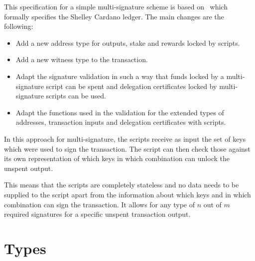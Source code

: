 \documentclass[11pt,a4paper,dvipsnames]{article}
\theoremstyle{definition}
\begin{document}
This specification for a simple multi-signature scheme is based
on~\cite{shelley_formal_spec} which formally specifies the Shelley Cardano
ledger. The main changes are the following:

\begin{itemize}
\item Add a new address type for outputs, stake and rewards locked by scripts.
\item Add a new witness type to the transaction.
\item Adapt the signature validation in such a way that funds locked by a
  multi-signature script can be spent and delegation certificates locked by
  multi-signature scripts can be used.
\item Adapt the functions used in the validation for the extended types of
  addresses, transaction inputs and delegation certificates with scripts.
\end{itemize}

In this approach for multi-signature, the scripts receive as input the set of
keys which were used to sign the transaction. The script can then check those
against its own representation of which keys in which combination can unlock the
unspent output.

This means that the scripts are completely stateless and no data needs to be
supplied to the script apart from the information about which keys and in which
combination can sign the transaction. It allows for any type of $n$ out of $m$
required signatures for a specific unspent transaction output.

\section{Types}
\label{sec:types}
\end{document}
